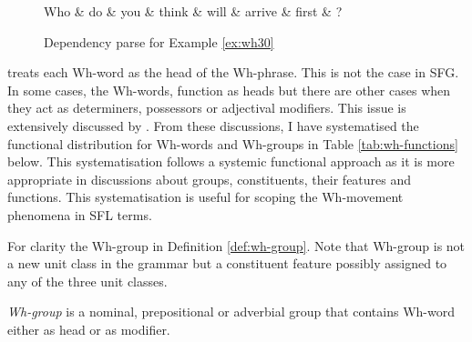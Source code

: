 \begin{figure}[!ht]
	\centering
	\begin{dependency}
		\begin{deptext}[]
			Who \& do \& you \& think \& will \& arrive \& first \& ?\\
		\end{deptext}
	\end{dependency}
	\caption{Dependency parse for Example \ref{ex:wh30}}
	\label{fig:e19}
\end{figure}


\citet[375]{Haegeman1991} treats each Wh-word as the head of the Wh-phrase. This is not the case in SFG. In some cases, the Wh-words, function as heads but there are other cases when they act as determiners, possessors or adjectival modifiers. This issue is extensively discussed by \citet{Abney1987,Quirk1985,Halliday2013}. From these discussions, I have systematised the functional distribution for Wh-words and Wh-groups in Table \ref{tab:wh-functions} below. This systematisation follows a systemic functional approach as it is more appropriate in discussions about groups, constituents, their features and functions. This systematisation is useful for scoping the Wh-movement phenomena in SFL terms.

For clarity the Wh-group in Definition \ref{def:wh-group}. Note that Wh-group is not a new unit class in the grammar but a constituent feature possibly assigned to any of the three unit classes.

\begin{definition}[Wh-group]\label{def:wh-group}
    \textit{Wh-group} is a nominal, prepositional or adverbial group that contains Wh-word either as head or as modifier. 
\end{definition}

